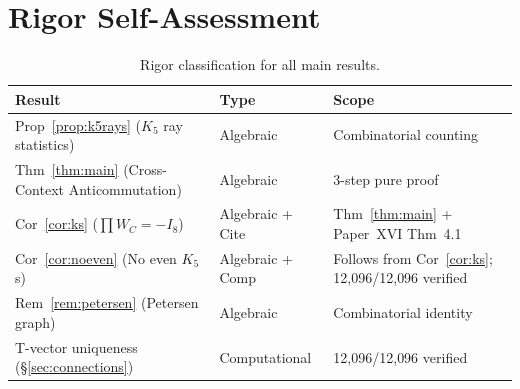 \documentclass[11pt,a4paper]{article}
\theoremstyle{remark}
\begin{document}
\appendix
\setcounter{table}{4}
\renewcommand{\thetable}{A\arabic{table}}
\renewcommand{\theHtable}{A\arabic{table}}
\section{Rigor Self-Assessment}

\begin{table}[H]
\centering
\caption{Rigor classification for all main results.}
\label{tab:rigor}
\begin{tabular}{p{6.2cm}lp{4.0cm}}
\toprule
Result & Type & Scope \\
\midrule
Prop~\ref{prop:k5rays} ($K_5$ ray statistics)
  & Algebraic & Combinatorial counting \\
Thm~\ref{thm:main} (Cross-Context Anticommutation)
  & Algebraic & 3-step pure proof \\
Cor~\ref{cor:ks} ($\prod W_C = -I_8$)
  & Algebraic + Cite & Thm~\ref{thm:main} + Paper~XVI Thm~4.1 \\
Cor~\ref{cor:noeven} (No even $K_5$s)
  & Algebraic + Comp & Follows from Cor~\ref{cor:ks};
                       12{,}096/12{,}096 verified \cite{PaperXVIIsuppl} \\
Rem~\ref{rem:petersen} (Petersen graph)
  & Algebraic & Combinatorial identity \\
T-vector uniqueness (\S\ref{sec:connections})
  & Computational & 12{,}096/12{,}096 verified \cite{PaperXVIIsuppl} \\
\bottomrule
\end{tabular}
\end{table}
\end{document}
